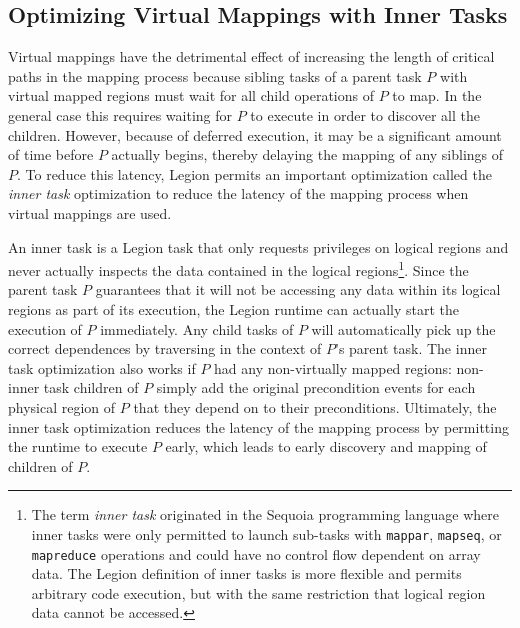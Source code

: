 \subsection{Optimizing Virtual Mappings with Inner Tasks}
\label{subsec:innertasks}
Virtual mappings have the detrimental effect of increasing
the length of critical paths in the mapping process because
sibling tasks of a parent task $P$ with virtual mapped
regions must wait for all child operations of $P$ to map. In the
general case this requires waiting for $P$ to execute in
order to discover all the children. However, because of 
deferred execution, it may be a significant amount of time
before $P$ actually begins, thereby delaying the mapping of
any siblings of $P$. To reduce this latency, Legion permits
an important optimization called the {\em inner task}
optimization to reduce the latency of the mapping process
when virtual mappings are used.

An inner task is a Legion task that only requests 
privileges on logical regions and never actually inspects
the data contained in the logical regions\footnote{The
term {\em inner task} originated in the Sequoia programming
language where inner tasks were only permitted to launch
sub-tasks with {\tt mappar}, {\tt mapseq}, or {\tt mapreduce}
operations and could have no control flow dependent on 
array data. The Legion definition of inner tasks is more
flexible and permits arbitrary code execution, but with the
same restriction that logical region data cannot be accessed.}.
Since the parent task $P$ guarantees that it will not be
accessing any data within its logical regions as part of its
execution, the Legion runtime can actually start the execution
of $P$ immediately. Any child tasks of $P$ will automatically
pick up the correct dependences by traversing in the context
of $P$'s parent task. The inner task optimization also works
if $P$ had any non-virtually mapped regions: non-inner task
children of $P$ simply add the original precondition events 
for each physical region of $P$ that they depend on to 
their preconditions. Ultimately, the inner task optimization
reduces the latency of the mapping process by permitting
the runtime to execute $P$ early, which leads to early 
discovery and mapping of children of $P$.


